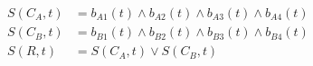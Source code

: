 \[
\begin{aligned}
S(C_{A},t)&=b_{A1}(t)\land b_{A2}(t)\land b_{A3}(t)\land b_{A4}(t)\\S(C_{B},t)&=b_{B1}(t)\land b_{B2}(t)\land b_{B3}(t)\land b_{B4}(t)\\S(R,t)&=S(C_{A},t)\lor S(C_{B},t)
\end{aligned}
\]
